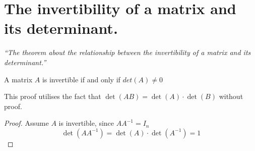 \documentclass[12pt]{report}
\begin{document}
    \section{The invertibility of a matrix and its determinant.}
    \textit{``The theorem about the relationship between the invertibility of a matrix and its determinant.''} \vspace{3mm}
    \begin{theorem}
        A matrix \(A\) is invertible if and only if \(det(A) \not = 0\)
    \end{theorem}
    This proof utilises the fact that \(\det (AB) = \det(A) \cdot \det(B)\) without proof.
    \begin{proof}
        Assume \(A\) is invertible, since \(AA^{-1} = I_n\)
        \[\det (AA^{-1}) = \det (A) \cdot \det (A^{-1}) = 1\]
    \end{proof}
\end{document}
